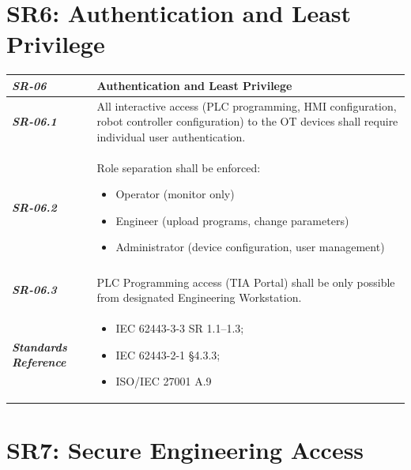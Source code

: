 \documentclass{report}
\begin{document}
\section{SR6: Authentication and Least Privilege}\label{SR6:auth}
\begin{tabularx}{\textwidth}{>{\bfseries}p{2.5cm} X}
    \textit{SR-06} & \textbf{Authentication and Least Privilege} \vspace{0.5em}\\
\toprule
\textit{SR-06.1} &
    All interactive access (PLC programming, HMI configuration, robot controller configuration) to the OT devices shall require individual user authentication.
    \vspace{0.5em}
\\
\textit{SR-06.2} &
    Role separation shall be enforced:
    \begin{itemize}[label=-, noitemsep, topsep=0pt, leftmargin=*]
        \item Operator (monitor only)
        \item Engineer (upload programs, change parameters)
        \item Administrator (device configuration, user management)
    \end{itemize} \vspace{1em} \\ 
    \vspace{0.5em}
    \\
\textit{SR-06.3} &
    PLC Programming access (TIA Portal) shall be only possible from designated Engineering Workstation.
    \vspace{0.5em}
    \\
\midrule
    \textit{Standards Reference} &
\begin{itemize}[label=-, noitemsep, topsep=0pt, leftmargin=*]
    \item IEC 62443-3-3 SR 1.1–1.3; 
    \item IEC 62443-2-1 §4.3.3; 
    \item ISO/IEC 27001 A.9
\end{itemize} \vspace{1em} \\ 
\end{tabularx}
\vspace{2em}

\section{SR7: Secure Engineering Access}\label{SR7:engineeringaccess}
\end{document}
